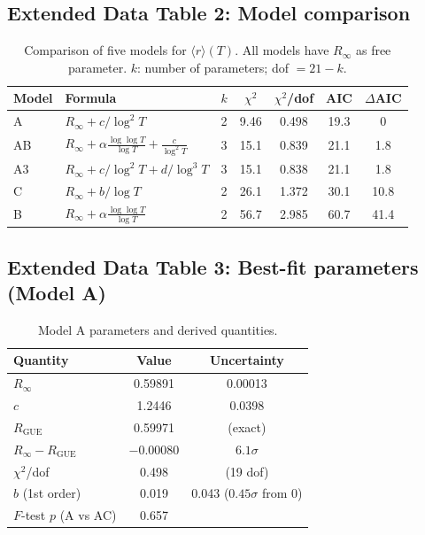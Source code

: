 \documentclass[10pt]{article}
\begin{document}
\subsection{Extended Data Table 2: Model comparison}

\begin{table}[H]
\centering
\caption{Comparison of five models for $\langle r\rangle(T)$.
All models have $R_\infty$ as free parameter. $k$: number of parameters;
dof $= 21 - k$.}
\label{tab:modelcomp}
\begin{tabular}{llccccc}
\toprule
Model & Formula & $k$ & $\chi^2$ & $\chi^2$/dof & AIC & $\Delta$AIC \\
\midrule
A  & $R_\infty + c/\log^2 T$ & 2 & 9.46 & 0.498 & 19.3 & 0 \\
AB & $R_\infty + \alpha\frac{\log\log T}{\log T} + \frac{c}{\log^2 T}$ & 3 & 15.1 & 0.839 & 21.1 & 1.8 \\
A3 & $R_\infty + c/\log^2 T + d/\log^3 T$ & 3 & 15.1 & 0.838 & 21.1 & 1.8 \\
C  & $R_\infty + b/\log T$ & 2 & 26.1 & 1.372 & 30.1 & 10.8 \\
B  & $R_\infty + \alpha\frac{\log\log T}{\log T}$ & 2 & 56.7 & 2.985 & 60.7 & 41.4 \\
\bottomrule
\end{tabular}
\end{table}


\subsection{Extended Data Table 3: Best-fit parameters (Model A)}

\begin{table}[H]
\centering
\caption{Model A parameters and derived quantities.}
\label{tab:params}
\begin{tabular}{lcc}
\toprule
Quantity & Value & Uncertainty \\
\midrule
$R_\infty$ & 0.59891 & 0.00013 \\
$c$ & 1.2446 & 0.0398 \\
$R_{\mathrm{GUE}}$ & 0.59971 & (exact) \\
$R_\infty - R_{\mathrm{GUE}}$ & $-0.00080$ & $6.1\sigma$ \\
$\chi^2$/dof & 0.498 & (19 dof) \\
$b$ (1st order) & 0.019 & 0.043 ($0.45\sigma$ from 0) \\
$F$-test $p$ (A vs AC) & 0.657 & \\
\bottomrule
\end{tabular}
\end{table}
\end{document}
